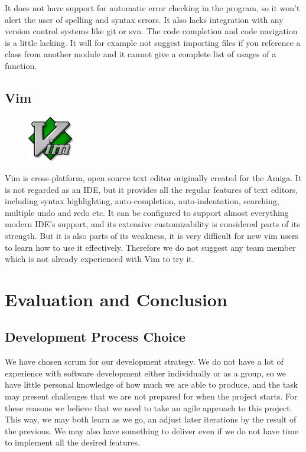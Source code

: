 It does not have support for automatic error checking in the program, so it
won’t alert the user of spelling and syntax errors. It also lacks integration
with any version control systems like git or svn. The code completion and
code navigation is a little lacking. It will for example not suggest importing
files if you reference a class from another module and it cannot give a
complete list of usages of a function.

\subsection{Vim}
\begin{figure}
	\begin{center}
	\vspace{-30pt}
		\includegraphics[width=2cm]{./planning/img/vim_logo}
	\vspace{-30pt}
	\end{center}
\end{figure}
Vim is cross-platform, open source text editor originally created for the
Amiga. It is not regarded as an IDE, but it provides all the regular features
of text editors, including syntax highlighting, auto-completion,
auto-indentation, searching, multiple undo and redo etc. It can be configured
to support almost everything modern IDE’s support, and its extensive
customizability is considered parts of its strength. But it is also parts of
its weakness, it is very difficult for new vim users to learn how to use it
effectively. Therefore we do not suggest any team member which is not already
experienced with Vim to try it.


\section{Evaluation and Conclusion}
\label{sec:pre:eval}

\subsection{Development Process Choice}
We have chosen scrum for our development strategy. We do not have a lot of
experience with software development either individually or as a group, so we
have little personal knowledge of how much we are able to produce, and the
task may present challenges that we are not prepared for when the project
starts. For these reasons we believe that we need to take an agile approach to
this project. This way, we may both learn as we go, an adjust later iterations
by the result of the previous. We may also have something to deliver even if we
do not have time to implement all the desired features.

